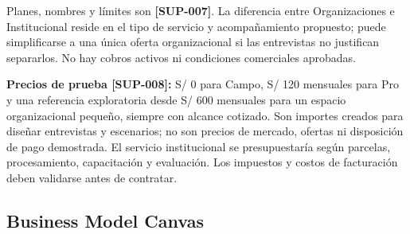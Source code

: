 \documentclass[10pt,a4paper]{article}
\begin{document}
Planes, nombres y límites son \textbf{[SUP-007]}. La diferencia entre Organizaciones e Institucional reside en el tipo de servicio y acompañamiento propuesto; puede simplificarse a una única oferta organizacional si las entrevistas no justifican separarlos. No hay cobros activos ni condiciones comerciales aprobadas.


\textbf{Precios de prueba [SUP-008]:} S/\allowbreak{} 0 para Campo, S/\allowbreak{} 120 mensuales para Pro y una referencia exploratoria desde S/\allowbreak{} 600 mensuales para un espacio organizacional pequeño, siempre con alcance cotizado. Son importes creados para diseñar entrevistas y escenarios; no son precios de mercado, ofertas ni disposición de pago demostrada. El servicio institucional se presupuestaría según parcelas, procesamiento, capacitación y evaluación. Los impuestos y costos de facturación deben validarse antes de contratar.


\subsection{Business Model Canvas}
\end{document}
